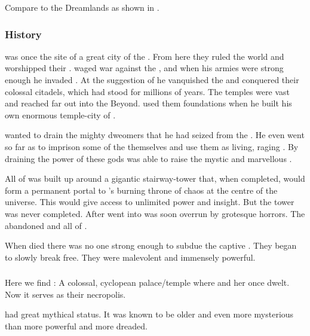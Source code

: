 Compare to the Dreamlands as shown in \cite{MichaelNelson:FallofCthulhuII}. 





\subsubsection{History}
\Nom was once the site of a great city of the .
From here they ruled the world and worshipped their .
 waged war against the \shugul, and when his armies were strong enough he invaded \Nom.
At the suggestion of  he vanquished the \shugul and conquered their colossal citadels, which had stood for millions of years.
The \shugul temples were vast and reached far out into the Beyond.
\Sethicus used them foundations when he built his own enormous temple-city of .

\Sethicus wanted to drain the mighty dweomers that he had seized from the \shugul.
He even went so far as to imprison some of the \moongods themselves and use them as living, raging \dweomers. 
By draining the power of these gods \Sethicus was able to raise the mystic and marvellous \Baltherium. 

All of \Baltherium was built up around a gigantic stairway-tower that, when completed, would form a permanent portal to \RuinSatha's burning throne of chaos at the centre of the universe. 
This would give \Sethicus access to unlimited power and insight. 
But the tower was never completed. 
After \Sethicus went into  \Baltherium was soon overrun by grotesque horrors. 
The \dragons abandoned \Baltherium and all of \Nom.

When \Sethicus died there was no one strong enough to subdue the captive \moongods.
They began to slowly break free. 
They were malevolent and immensely powerful.





\subsubsection{\Baltherium}
\index{\Baltherium}
Here we find \Baltherium: 
A colossal, cyclopean palace/temple where \Tiamat{} and her \firstgendragons{} once dwelt. 
Now it serves as their necropolis. 

\Baltherium had great mythical status.
It was known to be older and even more mysterious than \dash more powerful and more dreaded.

